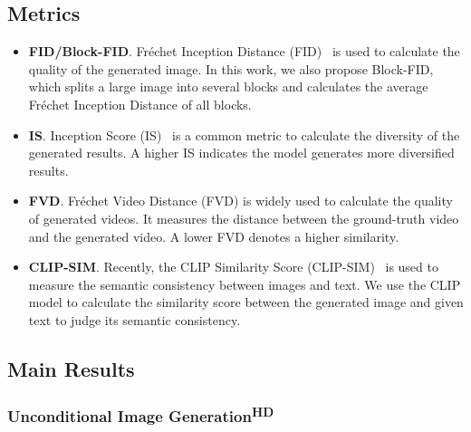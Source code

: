 \documentclass{article}
\begin{document}
\subsection{Metrics}

\begin{itemize}[leftmargin=*]

\item \textbf{FID/Block-FID}. Fréchet Inception Distance (FID)~\cite{heuselGansTrainedTwo2017} is used to calculate the quality of the generated image. In this work, we also propose Block-FID, which splits a large image into several blocks and calculates the average Fréchet Inception Distance of all blocks. 


\item \textbf{IS}. Inception Score (IS)~\cite{salimansImprovedTechniquesTraining2016} is a common metric to calculate the diversity of the generated results. A higher IS indicates the model generates more diversified results.
\item \textbf{FVD}. Fréchet Video Distance (FVD) \cite{unterthinerAccurateGenerativeModels2018} is widely used to calculate the quality of generated videos. It measures the distance between the ground-truth video and the generated video. A lower FVD denotes a higher similarity.
\item \textbf{CLIP-SIM}. Recently, the CLIP Similarity Score (CLIP-SIM)~\cite{radfordLearningTransferableVisual2021} is used to measure the  semantic consistency between images and text. We use the CLIP model to calculate the similarity score between the generated image and given text to judge its semantic consistency.
\end{itemize}

\subsection{Main Results}
\subsubsection{Unconditional Image Generation\textsuperscript{\textbf{HD}}}
\vspace{-2mm}
\end{document}
